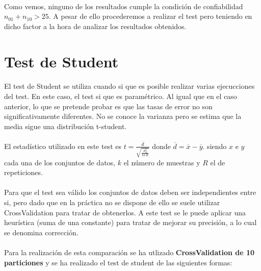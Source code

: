 \documentclass[10pt, a4paper,spanish]{article}
\begin{document}
		\paragraph{}
		Como vemos, ninguno de los resultados cumple la condición de confiabilidad $n_{01} + n_{10} > 25$. A pesar de ello procederemos a realizar el test pero teniendo en dicho factor a la hora de analizar los resultados obtenidos.


	\section{Test de Student}

		\paragraph{}
		El test de Student se utiliza cuando si que es posible realizar varias ejecucciones del test. En este caso, el test si que es paramétrico. Al igual que en el caso anterior, lo que se pretende probar es que las tasas de error no son significativamente diferentes. No se conoce la varianza pero se estima que la media sigue una distribución t-student.

		\paragraph{}
		El estadístico utilizado en este test es $t = \frac{\overline{d}}{\sqrt{\frac{S^2_d}{k x R}}}$ donde $\overline{d} = \overline{x} - \overline{y}$. siendo $x$ e $y$ cada una de los conjuntos de datos, $k$ el número de muestras y $R$ el de repeticiones.

		\paragraph{}
		Para que el test sea válido los conjuntos de datos deben ser independientes entre si, pero dado que en la práctica no se dispone de ello se suele utilizar CrossValidation para tratar de obtenerlos. A este test se le puede aplicar una heurística (suma de una constante) para tratar de mejorar su precisión, a lo cual se denomina corrección.

		\paragraph{}
		Para la realización de esta comparación se ha utlizado \textbf{CrossValidation de 10 particiones} y se ha realizado el test de student de las siguientes formas:
\end{document}
